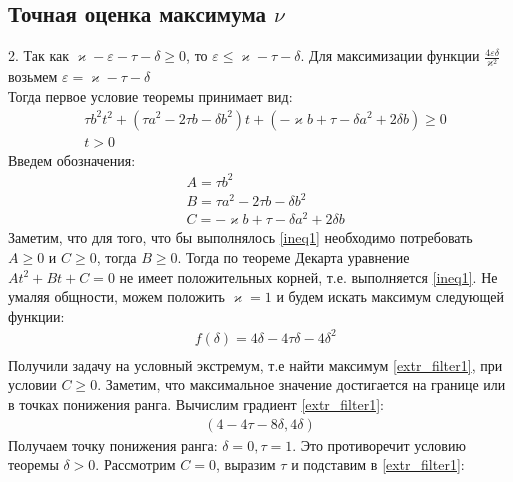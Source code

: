 \documentclass[a4paper,14pt]{extarticle} %
\begin{document}
\subsection{Точная оценка максимума $\nu$}
2. Так как $\varkappa - \varepsilon - \tau - \delta \geq 0$, то $ \varepsilon \leq \varkappa - \tau - \delta$. Для максимизации функции $\frac{4\varepsilon\delta}{\varkappa^2}$ возьмем $\varepsilon = \varkappa - \tau - \delta$\\
Тогда первое условие теоремы принимает вид:
\begin{equation}\label{ineq1} 
 \begin{aligned}
&\tau b^2t^2 + (\tau a^2-2 \tau b - \delta b^2)t + (-\varkappa b+\tau-\delta a^2 + 2\delta b) \geq 0\\
&t > 0
 \end{aligned}
\end{equation}
Введем обозначения:
\begin{equation}
 \begin{aligned}
&A = \tau b^2\\
&B = \tau a^2-2 \tau b - \delta b^2\\
&C = -\varkappa b+\tau-\delta a^2 + 2\delta b
 \end{aligned}
\end{equation}
Заметим, что для того, что бы выполнялось \eqref{ineq1} необходимо потребовать $A \geq 0$ и $C \geq 0$, тогда $B \geq 0$. Тогда по теореме Декарта уравнение $At^2 + Bt + C = 0$ не имеет положительных корней, т.е. выполняется \eqref{ineq1}. Не умаляя общности, можем положить $\varkappa = 1$ и будем искать максимум следующей функции: 
\begin{equation}\label{extr_filter1}
 \begin{aligned}
&f(\delta) = 4\delta-4\tau\delta - 4\delta^2\\
 \end{aligned}
\end{equation} 
Получили задачу на условный экстремум, т.е найти максимум \eqref{extr_filter1}, при условии $C \geq 0$.  Заметим, что максимальное значение достигается на границе или в точках понижения ранга. Вычислим градиент \eqref{extr_filter1}:
\begin{equation}
 \begin{aligned}
(4 - 4\tau - 8\delta, 4\delta)
 \end{aligned}
\end{equation} 
Получаем точку понижения ранга: $\delta = 0, \tau = 1$. Это противоречит условию теоремы $\delta > 0$. Рассмотрим $C = 0$, выразим $\tau$ и подставим в \eqref{extr_filter1}:
\end{document}

